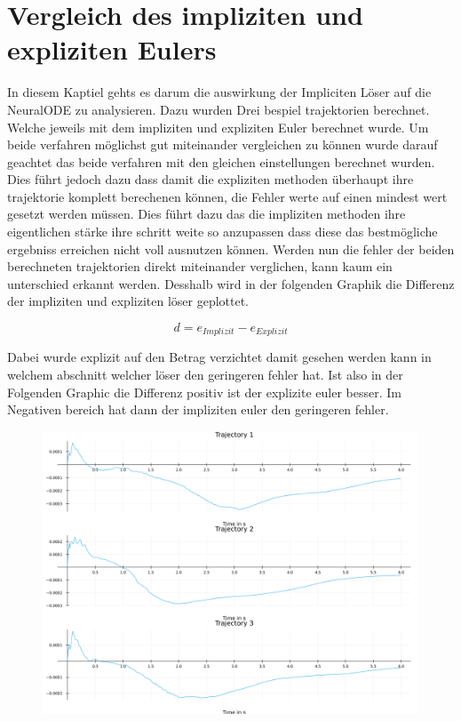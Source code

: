 
\section{Vergleich des impliziten und expliziten Eulers}

In diesem Kaptiel gehts es darum die auswirkung der Impliciten Löser auf die NeuralODE zu analysieren.
Dazu wurden Drei bespiel trajektorien berechnet.
Welche jeweils mit dem impliziten und expliziten Euler berechnet wurde.
Um beide verfahren möglichst gut miteinander vergleichen zu können wurde darauf geachtet das beide verfahren mit den gleichen einstellungen berechnet wurden.
Dies führt jedoch dazu dass damit die expliziten methoden
überhaupt ihre trajektorie komplett berechenen können, 
die Fehler werte auf einen mindest wert gesetzt werden müssen.
Dies führt dazu das die impliziten methoden ihre eigentlichen stärke ihre schritt weite so anzupassen 
dass diese das bestmögliche ergebniss erreichen nicht 
voll ausnutzen können.
Werden nun die fehler der beiden berechneten trajektorien
direkt miteinander verglichen, kann kaum ein unterschied erkannt werden.
Desshalb wird in der folgenden Graphik
die Differenz der impliziten und expliziten löser geplottet.

$$
d = e_{Implizit} - e_{Explizit}
$$

Dabei wurde explizit auf den Betrag verzichtet damit gesehen werden kann in welchem abschnitt welcher löser den geringeren fehler hat.
Ist also in der Folgenden Graphic die Differenz positiv 
ist der explizite euler besser.
Im Negativen bereich hat dann der impliziten euler den geringeren fehler.

\begin{figure}
\includegraphics[width=\textwidth]{Data/03_Ergebnisse/errors.png}
\label{fig:eulervergleich}
\end{figure}

